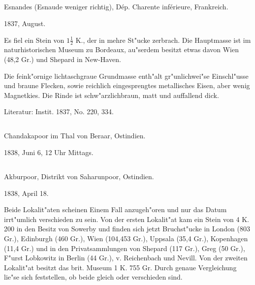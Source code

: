 \documentclass[a4paper, 11pt, oneside]{article}
\begin{document}
\subsection{}
\LARGE
\paragraph{}
Esnandes (Esnaude weniger richtig), Dép. Charente inférieure, Frankreich.

1837, August.

Es fiel ein Stein von $\mathfrak{1\frac{1}{2}}$ K., der in mehre St"ucke zerbrach. Die Hauptmasse ist im naturhistorischen Museum zu Bordeaux, au"serdem besitzt etwas davon Wien (48,2 Gr.) und Shepard in New-Haven.

Die feink"ornige lichtaschgraue Grundmasse enth"alt gr"unlichwei"se Einschl"usse und braune Flecken, sowie reichlich eingesprengtes metallisches Eisen, aber wenig Magnetkies. Die Rinde ist schw"arzlichbraun, matt und auffallend dick.

\normalsize
Literatur: Instit. 1837, No. 220, 334.

\subsection{}
\LARGE
\paragraph{}
Chandakapoor im Thal von Beraar, Ostindien.

1838, Juni 6, 12 Uhr Mittags.

\subsection{}
\LARGE
\paragraph{}
Akburpoor, Distrikt von Saharunpoor, Ostindien.

1838, April 18.

Beide Lokalit"aten scheinen Einem Fall anzugeh"oren und nur das Datum irrt"umlich verschieden zu sein. Von der ersten Lokalit"at kam ein Stein von 4 K. 200 in den Besitz von Sowerby und finden sich jetzt Bruchst"ucke in London (803 Gr.), Edinburgh (460 Gr.), Wien (104,453 Gr.), Uppsala (35,4 Gr.), Kopenhagen (11,4 Gr.) und in den Privatsammlungen von Shepard (117 Gr.), Greg (50 Gr.), F"urst Lobkowitz in Berlin (44 Gr.), v. Reichenbach und Nevill. Von der zweiten Lokalit"at besitzt das brit. Museum 1 K. 755 Gr. Durch genaue Vergleichung lie"se sich feststellen, ob beide gleich oder verschieden sind.
\end{document}
